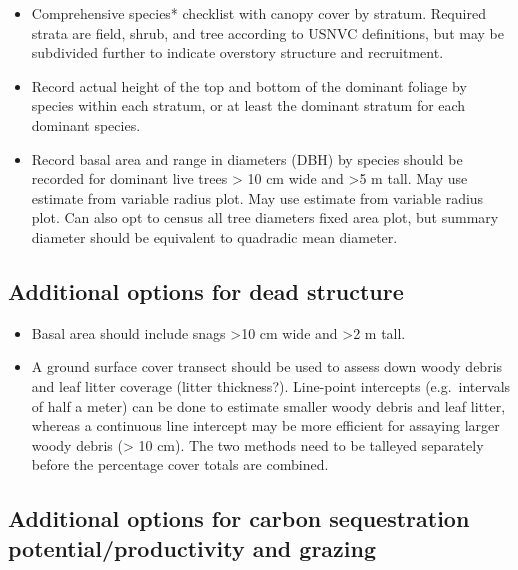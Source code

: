 \documentclass[
]{book}
\begin{document}
\begin{itemize}
\item
  Comprehensive species* checklist with canopy cover by stratum. Required strata are field, shrub, and tree according to USNVC definitions, but may be subdivided further to indicate overstory structure and recruitment.
\item
  Record actual height of the top and bottom of the dominant foliage by species within each stratum, or at least the dominant stratum for each dominant species.
\item
  Record basal area and range in diameters (DBH) by species should be recorded for dominant live trees \textgreater{} 10 cm wide and \textgreater5 m tall. May use estimate from variable radius plot. May use estimate from variable radius plot. Can also opt to census all tree diameters fixed area plot, but summary diameter should be equivalent to quadradic mean diameter.
\end{itemize}

\hypertarget{additional-options-for-dead-structure}{%
\subsection*{Additional options for dead structure}\label{additional-options-for-dead-structure}}

\begin{itemize}
\item
  Basal area should include snags \textgreater10 cm wide and \textgreater2 m tall.
\item
  A ground surface cover transect should be used to assess down woody debris and leaf litter coverage (litter thickness?). Line-point intercepts (e.g.~intervals of half a meter) can be done to estimate smaller woody debris and leaf litter, whereas a continuous line intercept may be more efficient for assaying larger woody debris (\textgreater{} 10 cm). The two methods need to be talleyed separately before the percentage cover totals are combined.
\end{itemize}

\hypertarget{additional-options-for-carbon-sequestration-potentialproductivity-and-grazing}{%
\subsection*{Additional options for carbon sequestration potential/productivity and grazing}\label{additional-options-for-carbon-sequestration-potentialproductivity-and-grazing}}
\end{document}

